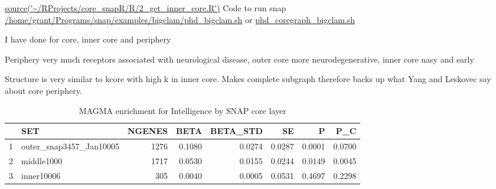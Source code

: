 \url{source('~/RProjects/core_snapR/R/2_get_inner_core.R')}
Code to run snap
\url{/home/grant/Programs/snap/examples/bigclam/phd_bigclam.sh} or \url{phd_coregraph_bigclam.sh}

I have done for core, inner core and periphery

Periphery very much receptors associated with neurological disease, outer core more neurodegenerative, inner core nasy and early

Structure is very similar to kcore with high k in inner core. Makes complete subgraph therefore backs up what Yang and Leskovec say about core periphery. 

\begin{table}[ht]
\centering
\begin{tabular}{rlrrrrrr}
  \hline
 & SET & NGENES & BETA & BETA\_STD & SE & P & P\_C \\ 
  \hline
1 & outer\_snap3457\_Jan10005 &  1276 & 0.1080 & 0.0274 & 0.0287 & 0.0001 & 0.0700 \\ 
  2 & middle1000 &  1717 & 0.0530 & 0.0155 & 0.0244 & 0.0149 & 0.0045 \\ 
  3 & inner10006 &   305 & 0.0040 & 0.0005 & 0.0531 & 0.4697 & 0.2298 \\ 
   \hline
\end{tabular}
\caption{MAGMA enrichment for Intelligence by SNAP core layer} 
\label{Table:MAGMA enrichment for Intelligence by SNAP core layer}
\end{table}

